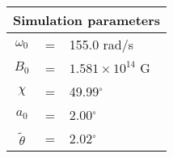  \begin{tabular}{ccl}
\multicolumn{3}{c}{Simulation parameters} \\
\hline
$\omega_0$  &=& 155.0 rad/s\\
$B_0$  &=& $ 1.581\times 10^{14} $ G \\
$\chi$  &=& 49.99$^{\circ}$ \\
$a_0$ &=& 2.00$^{\circ}$ \\
$\tilde{\theta}$ &= & 2.02$^{\circ}$
\end{tabular}
    